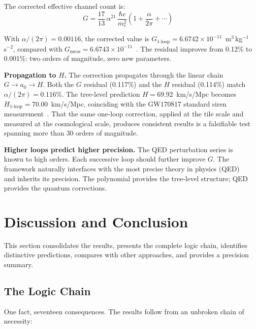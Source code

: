 \documentclass[aps,prd,preprint,superscriptaddress,showpacs,preprintnumbers,amsmath,amssymb,nofootinbib]{revtex4-2}
\begin{document}
The corrected effective channel count is:
\begin{equation}
G = \frac{17}{13}\,\alpha^{21}\,\frac{\hbar c}{m_e^2}\left(1 + \frac{\alpha}{2\pi} + \cdots\right)
\label{eq:G-oneloop}
\end{equation}

With $\alpha/(2\pi) = 0.00116$, the corrected value is $G_{1\text{-loop}} = 6.6742 \times 10^{-11}$~m$^3$\,kg$^{-1}$\,s$^{-2}$, compared with $G_{\text{meas}} = 6.6743 \times 10^{-11}$~\cite{codata2022}. The residual improves from 0.12\% to 0.001\%: two orders of magnitude, zero new parameters.

\textbf{Propagation to $H$.} The correction propagates through the linear chain $G \to a_0 \to H$. Both the $G$ residual (0.117\%) and the $H$ residual (0.114\%) match $\alpha/(2\pi) = 0.116\%$. The tree-level prediction $H = 69.92$~km/s/Mpc becomes $H_{1\text{-loop}} = 70.00$~km/s/Mpc, coinciding with the GW170817 standard siren measurement~\cite{gw170817}. That the same one-loop correction, applied at the tile scale and measured at the cosmological scale, produces consistent results is a falsifiable test spanning more than 30 orders of magnitude.

\textbf{Higher loops predict higher precision.} The QED perturbation series is known to high orders. Each successive loop should further improve $G$. The framework naturally interfaces with the most precise theory in physics (QED) and inherits its precision. The polynomial provides the tree-level structure; QED provides the quantum corrections.

\section{Discussion and Conclusion}
\label{sec:conclusion}

This section consolidates the results, presents the complete logic chain, identifies distinctive predictions, compares with other approaches, and provides a precision summary.

\subsection{The Logic Chain}
\label{subsec:chain}

One fact, seventeen consequences. The results follow from an unbroken chain of necessity:
\end{document}
